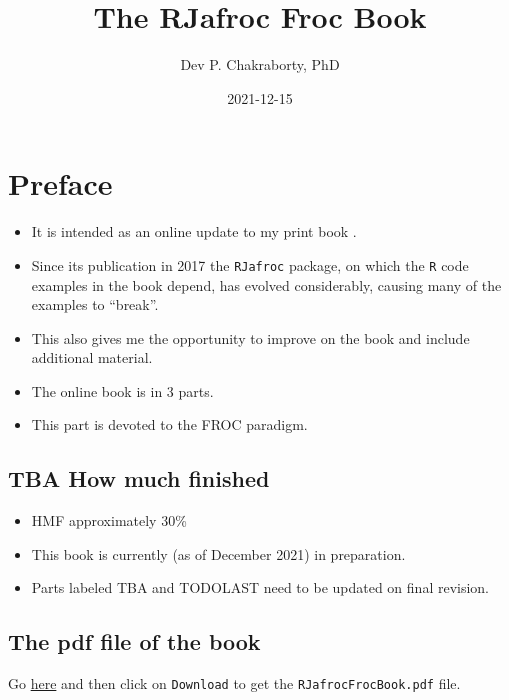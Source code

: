 \documentclass[
]{book}
\title{The RJafroc Froc Book}
\author{Dev P. Chakraborty, PhD}
\date{2021-12-15}
\providecommand{\tightlist}{%
  \setlength{\itemsep}{0pt}\setlength{\parskip}{0pt}}
\begin{document}
\maketitle

{
\setcounter{tocdepth}{1}
\tableofcontents
}
\hypertarget{preface}{%
\chapter*{Preface}\label{preface}}

\begin{itemize}
\tightlist
\item
  It is intended as an online update to my print book \citep{chakraborty2017observer}.
\item
  Since its publication in 2017 the \texttt{RJafroc} package, on which the \texttt{R} code examples in the book depend, has evolved considerably, causing many of the examples to ``break''.
\item
  This also gives me the opportunity to improve on the book and include additional material.
\item
  The online book is in 3 parts.
\item
  This part is devoted to the FROC paradigm.
\end{itemize}

\hypertarget{tba-how-much-finished}{%
\section*{TBA How much finished}\label{tba-how-much-finished}}

\begin{itemize}
\tightlist
\item
  HMF approximately 30\%
\item
  This book is currently (as of December 2021) in preparation.
\item
  Parts labeled TBA and TODOLAST need to be updated on final revision.
\end{itemize}

\hypertarget{the-pdf-file-of-the-book}{%
\section*{The pdf file of the book}\label{the-pdf-file-of-the-book}}

Go \href{https://github.com/dpc10ster/RJafrocFrocBook/blob/gh-pages/RJafrocFrocBook.pdf}{here} and then click on \texttt{Download} to get the \texttt{RJafrocFrocBook.pdf} file.
\end{document}
